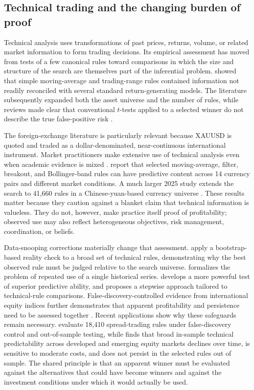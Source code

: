 \subsection{Technical trading and the changing burden of proof}

Technical analysis uses transformations of past prices, returns, volume, or related market information to form trading decisions. Its empirical assessment has moved from tests of a few canonical rules toward comparisons in which the size and structure of the search are themselves part of the inferential problem. \citet{brock1992} showed that simple moving-average and trading-range rules contained information not readily reconciled with several standard return-generating models. The literature subsequently expanded both the asset universe and the number of rules, while reviews made clear that conventional $t$-tests applied to a selected winner do not describe the true false-positive risk \citep{park2007}.

The foreign-exchange literature is particularly relevant because XAUUSD is quoted and traded as a dollar-denominated, near-continuous international instrument. Market practitioners make extensive use of technical analysis even when academic evidence is mixed \citep{menkhoff2007}. \citet{dockery2023} report that selected moving-average, filter, breakout, and Bollinger-band rules can have predictive content across 14 currency pairs and different market conditions. A much larger 2025 study extends the search to 41,660 rules in a Chinese-yuan-based currency universe \citep{song2025}. These results matter because they caution against a blanket claim that technical information is valueless. They do not, however, make practice itself proof of profitability; observed use may also reflect heterogeneous objectives, risk management, coordination, or beliefs.

Data-snooping corrections materially change that assessment. \citet{sullivan1999} apply a bootstrap-based reality check to a broad set of technical rules, demonstrating why the best observed rule must be judged relative to the search universe. \citet{white2000} formalizes the problem of repeated use of a single historical series. \citet{hansen2005} develops a more powerful test of superior predictive ability, and \citet{hsu2010} proposes a stepwise approach tailored to technical-rule comparisons. False-discovery-controlled evidence from international equity indices further demonstrates that apparent profitability and persistence need to be assessed together \citep{sermpinis2021}. Recent applications show why these safeguards remain necessary. \citet{psaradellis2023} evaluate 18,410 spread-trading rules under false-discovery control and out-of-sample testing, while \citet{rink2023} finds that broad in-sample technical predictability across developed and emerging equity markets declines over time, is sensitive to moderate costs, and does not persist in the selected rules out of sample. The shared principle is that an apparent winner must be evaluated against the alternatives that could have become winners and against the investment conditions under which it would actually be used.


